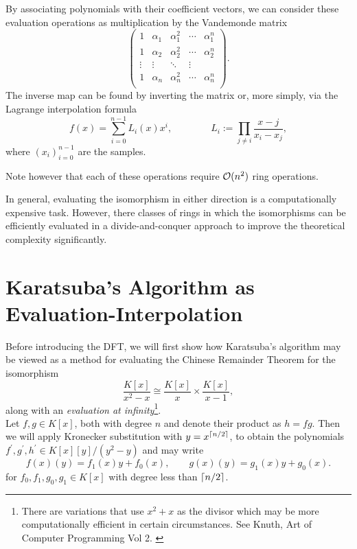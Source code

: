 By associating polynomials with their coefficient vectors, we can consider these evaluation operations as multiplication by the Vandemonde matrix
\[
  \begin{pmatrix}
      1 & \alpha_1 & \alpha_1^2 & \cdots & \alpha_1^n\\
      1 & \alpha_2 & \alpha_2^2 & \cdots & \alpha_2^n\\
      \vdots & \vdots & \ddots & \vdots\\
      1 & \alpha_n & \alpha_n^2 & \cdots & \alpha_n^n\\
  \end{pmatrix}.
\]
The inverse map can be found by inverting the matrix or, more simply, via the Lagrange interpolation formula
\[
    f(x) = \sum_{i=0}^{n-1} L_i(x)x^i, \qquad \qquad L_i := \prod_{j \neq i} \frac{x - j}{x_i - x_j} ,
\]
where $(x_i)_{i=0}^{n-1}$ are the samples.

Note however that each of these operations require $\mathcal O(n^2)$ ring operations.

In general, evaluating the isomorphism in either direction is a computationally expensive task. However, there classes of rings in which the isomorphisms can be efficiently evaluated in a divide-and-conquer approach to improve the theoretical complexity significantly.

\section{Karatsuba's Algorithm as Evaluation-Interpolation}%
\label{sec:Karatsuba's Algorithms as Evaluation-Interpolation}

Before introducing the DFT, we will first show how Karatsuba's algorithm may be viewed as a method for evaluating the Chinese Remainder Theorem for the isomorphism
\begin{equation}\label{eq:crt-karatsuba-iso}
    \frac{K[x]}{x^2 - x} \cong \frac{K[x]}{x} \times \frac{K[x]}{x-1},
\end{equation}
along with an \emph{evaluation at infinity}\footnote{There are variations that use $x^2 + x$ as the divisor which may be more computationally efficient in certain circumstances. See Knuth, Art of Computer Programming Vol 2. \cite{knuthv2}}.\\

Let $f, g \in K[x]$, both with degree $n$ and denote their product as $h = fg$. Then we will apply Kronecker substitution with $y = x^{\left \lceil n/2 \right \rceil}$, to obtain the polynomials $f^\prime, g^\prime, h^\prime \in K[x][y]/(y^2 - y)$ and may write
\[
    f(x)(y) = f_1(x)y + f_0(x), \qquad g(x)(y) = g_1(x)y + g_0(x).
\]
for $f_0, f_1, g_0, g_1 \in K[x]$ with degree less than $\left \lceil n/2 \right \rceil$.

